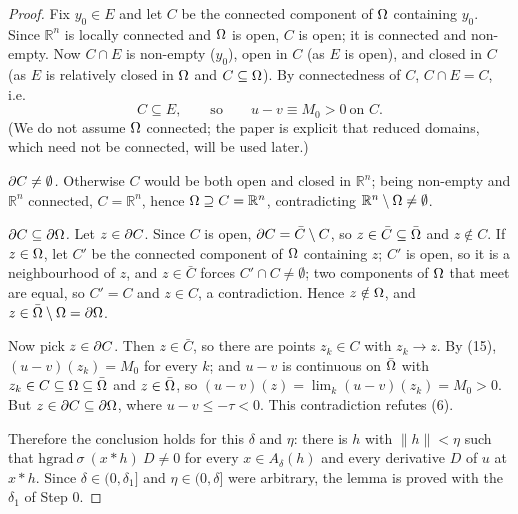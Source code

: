 \begin{proof}
Fix $y_0\in E$ and let $C$ be the connected component of $\Omega$ containing $y_0$. Since
$\mathbb R^{n}$ is locally connected and $\Omega$ is open, $C$ is open; it is connected and
non-empty. Now $C\cap E$ is non-empty ($y_0$), open in $C$ (as $E$ is open), and closed in
$C$ (as $E$ is relatively closed in $\Omega$ and $C\subseteq\Omega$). By connectedness of $C$,
$C\cap E=C$, i.e.
\[
 C\subseteq E,\qquad\text{so}\qquad u-v\equiv M_0>0\ \text{on } C. \tag{15}
\]
(We do not assume $\Omega$ connected; the paper is explicit that reduced domains, which need
not be connected, will be used later.)

\emph{$\partial C\ne\emptyset$.} Otherwise $C$ would be both open and closed in
$\mathbb R^{n}$; being non-empty and $\mathbb R^{n}$ connected, $C=\mathbb R^{n}$, hence
$\Omega\supseteq C=\mathbb R^{n}$, contradicting $\mathbb R^{n}\setminus\Omega\ne\emptyset$.

\emph{$\partial C\subseteq\partial\Omega$.} Let $z\in\partial C$. Since $C$ is open,
$\partial C=\bar C\setminus C$, so $z\in\bar C\subseteq\bar{\Omega}$ and $z\notin C$. If $z\in\Omega$, let
$C'$ be the connected component of $\Omega$ containing $z$; $C'$ is open, so it is a
neighbourhood of $z$, and $z\in\bar C$ forces $C'\cap C\ne\emptyset$; two components of
$\Omega$ that meet are equal, so $C'=C$ and $z\in C$, a contradiction. Hence $z\notin\Omega$, and
$z\in\bar{\Omega}\setminus\Omega=\partial\Omega$.

Now pick $z\in\partial C$. Then $z\in\bar C$, so there are points $z_k\in C$ with $z_k\to z$. By
(15), $(u-v)(z_k)=M_0$ for every $k$; and $u-v$ is continuous on $\bar{\Omega}$ with
$z_k\in C\subseteq\Omega\subseteq\bar{\Omega}$ and $z\in\bar{\Omega}$, so
$(u-v)(z)=\lim_k(u-v)(z_k)=M_0>0$. But $z\in\partial C\subseteq\partial\Omega$, where $u-v\le-\tau<0$.
This contradiction refutes (6).

\medskip\noindent Therefore the conclusion holds for this $\delta$ and $\eta$: there is $h$
with $\|h\|<\eta$ such that $\mathrm{hgrad}\ \sigma\ (x*h)\ D\ne0$ for every
$x\in A_\delta(h)$ and every derivative $D$ of $u$ at $x*h$. Since $\delta\in(0,\delta_1]$
and $\eta\in(0,\delta]$ were arbitrary, the lemma is proved with the $\delta_1$ of Step 0.
\end{proof}

